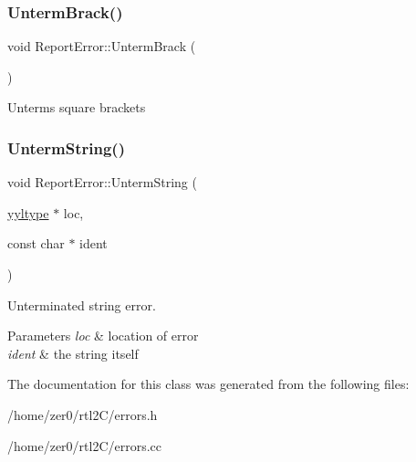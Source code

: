 \subsubsection{\texorpdfstring{Unterm\+Brack()}{UntermBrack()}}
{\footnotesize\ttfamily void Report\+Error\+::\+Unterm\+Brack (\begin{DoxyParamCaption}{ }\end{DoxyParamCaption})\hspace{0.3cm}{\ttfamily [static]}}

Unterms square brackets \mbox{\label{class_report_error_afcea6674af39a926a615b9318db590e3}} 
\subsubsection{\texorpdfstring{Unterm\+String()}{UntermString()}}
{\footnotesize\ttfamily void Report\+Error\+::\+Unterm\+String (\begin{DoxyParamCaption}\item[{\hyperlink{structyyltype}{yyltype} $\ast$}]{loc,  }\item[{const char $\ast$}]{ident }\end{DoxyParamCaption})\hspace{0.3cm}{\ttfamily [static]}}

Unterminated string error. 
\begin{DoxyParams}{Parameters}
{\em loc} & location of error \\
\hline
{\em ident} & the string itself \\
\hline
\end{DoxyParams}


The documentation for this class was generated from the following files\+:\begin{DoxyCompactItemize}
\item 
/home/zer0/rtl2\+C/errors.\+h\item 
/home/zer0/rtl2\+C/errors.\+cc\end{DoxyCompactItemize}
